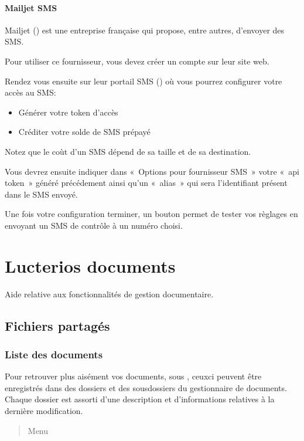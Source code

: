\documentclass[letterpaper,10pt,french]{sphinxmanual}
\begin{document}
\subsubsection{Mailjet SMS}
\label{\detokenize{mailing/configuration:mailjet-sms}}
Mailjet () est une entreprise française qui propose, entre autres, d’envoyer des SMS.

Pour utiliser ce fournisseur, vous devez créer un compte sur leur site web.

Rendez vous ensuite sur leur portail SMS () où vous pourrez configurer votre accès au SMS:
\begin{itemize}
\item {} 
Générer votre token d’accès

\item {} 
Créditer votre solde de SMS prépayé

\end{itemize}

Notez que le coùt d’un SMS dépend de sa taille et de sa destination.

Vous devrez ensuite indiquer dans « Options pour fournisseur SMS » votre « api token » généré précédement
ainsi qu’un « alias » qui sera l’identifiant présent dans le SMS envoyé.

Une fois votre configuration terminer, un bouton  permet de tester vos règlages en envoyant un SMS de contrôle à un numéro choisi.


\chapter{Lucterios documents}
\label{\detokenize{documents/index:lucterios-documents}}\label{\detokenize{documents/index::doc}}
Aide relative aux fonctionnalités de gestion documentaire.


\section{Fichiers partagés}
\label{\detokenize{documents/shared_document:fichiers-partages}}\label{\detokenize{documents/shared_document::doc}}

\subsection{Liste des documents}
\label{\detokenize{documents/shared_document:liste-des-documents}}
Pour retrouver plus aisément vos documents, sous , ceux\sphinxhyphen{}ci peuvent être enregistrés dans des dossiers et des sous\sphinxhyphen{}dossiers du gestionnaire de documents.
Chaque dossier est assorti d’une description et d’informations relatives à la dernière modification.
\begin{quote}

Menu 
\end{quote}
\end{document}
